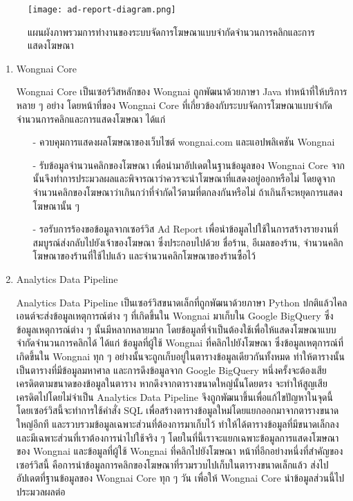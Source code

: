 \begin{figure}[!h]
	\centering
	\texttt{[image: ad-report-diagram.png]}  
	\caption{แผนผังภาพรวมการทำงานของระบบจัดการโฆษณาแบบจำกัดจำนวนการคลิกและการแสดงโฆษณา}
	\label{Fig:adreport-diagram}
\end{figure}

\begin{enumerate}
	\item Wongnai Core
	
	Wongnai Core เป็นเซอร์วิสหลักของ Wongnai ถูกพัฒนาด้วยภาษา Java ทำหน้าที่ให้บริการหลาย ๆ อย่าง โดยหน้าที่ของ Wongnai Core ที่เกี่ยวข้องกับระบบจัดการโฆษณาแบบจำกัดจำนวนการคลิกและการแสดงโฆษณา ได้แก่ 
	\begin{itemize}
		\item[-] ควบคุมการแสดงผลโฆษณาของเว็บไซต์ wongnai.com และแอปพลิเคชัน Wongnai
		\item[-] รับข้อมูลจำนวนคลิกของโฆษณา เพื่อนำมาอัปเดตในฐานข้อมูลของ Wongnai Core จากนั้นจึงทำการประมวลผลและพิจารณาว่าควรจะนำโฆษณาที่แสดงอยู่ออกหรือไม่ โดยดูจากจำนวนคลิกของโฆษณาว่าเกินกว่าที่จำกัดไว้ตามที่ตกลงกันหรือไม่ ถ้าเกินก็จะหยุดการแสดงโฆษณานั้น ๆ
		\item[-] รอรับการร้องขอข้อมูลจากเซอร์วิส Ad Report เพื่อนำข้อมูลไปใช้ในการสร้างรายงานที่สมบูรณ์ส่งกลับไปยังเจ้าของโฆษณา ซึ่งประกอบไปด้วย ชื่อร้าน, อีเมลของร้าน, จำนวนคลิกโฆษณาของร้านที่ใช้ไปแล้ว และจำนวนคลิกโฆษณาของร้านซื้อไว้
	\end{itemize}
	\item Analytics Data Pipeline
	
	Analytics Data Pipeline เป็นเซอร์วิสขนาดเล็กที่ถูกพัฒนาด้วยภาษา Python ปกติแล้วไคลเอนต์จะส่งข้อมูลเหตุการณ์ต่าง ๆ ที่เกิดขึ้นใน Wongnai มาเก็บใน Google BigQuery ซึ่งข้อมูลเหตุการณ์ต่าง ๆ นั้นมีหลากหลายมาก โดยข้อมูลที่จำเป็นต้องใช้เพื่อให้แสดงโฆษณาแบบจำกัดจำนวนการคลิกได้ ได้แก่ ข้อมูลที่ผู้ใช้ Wongnai ที่คลิกไปยังโฆษณา ซึ่งข้อมูลเหตุการณ์ที่เกิดขึ้นใน Wongnai ทุก ๆ อย่างนั้นจะถูกเก็บอยู่ในตารางข้อมูลเดียวกันทั้งหมด ทำให้ตารางนั้นเป็นตารางที่มีข้อมูลมหาศาล และการดึงข้อมูลจาก Google BigQuery หนึ่งครั้งจะต้องเสียเครดิตตามขนาดของข้อมูลในตาราง หากดึงจากตารางขนาดใหญ่นั้นโดยตรง จะทำให้สูญเสียเครดิตไปโดยไม่จำเป็น Analytics Data Pipeline จึงถูกพัฒนาขึ้นเพื่อแก้ไขปัญหาในจุดนี้ โดยเซอร์วิสนี้จะทำการใช้คำสั่ง SQL เพื่อสร้างตารางข้อมูลใหม่โดยแยกออกมาจากตารางขนาดใหญ่อีกที และรวบรวมข้อมูลเฉพาะส่วนที่ต้องการมาเก็บไว้ ทำให้ได้ตารางข้อมูลที่มีขนาดเล็กลง และมีเฉพาะส่วนที่เราต้องการนำไปใช้จริง ๆ โดยในที่นี้เราจะแยกเฉพาะข้อมูลการแสดงโฆษณาของ Wongnai และข้อมูลที่ผู้ใช้ Wongnai ที่คลิกไปยังโฆษณา หน้าที่อีกอย่างหนึ่งที่สำคัญของเซอร์วิสนี้ คือการนำข้อมูลการคลิกของโฆษณาที่รวมรวบไปเก็บในตารางขนาดเล็กแล้ว ส่งไปอัปเดตที่ฐานข้อมูลของ Wongnai Core ทุก ๆ วัน เพื่อให้ Wongnai Core นำข้อมูลส่วนนี้ไปประมวลผลต่อ


\end{enumerate}
